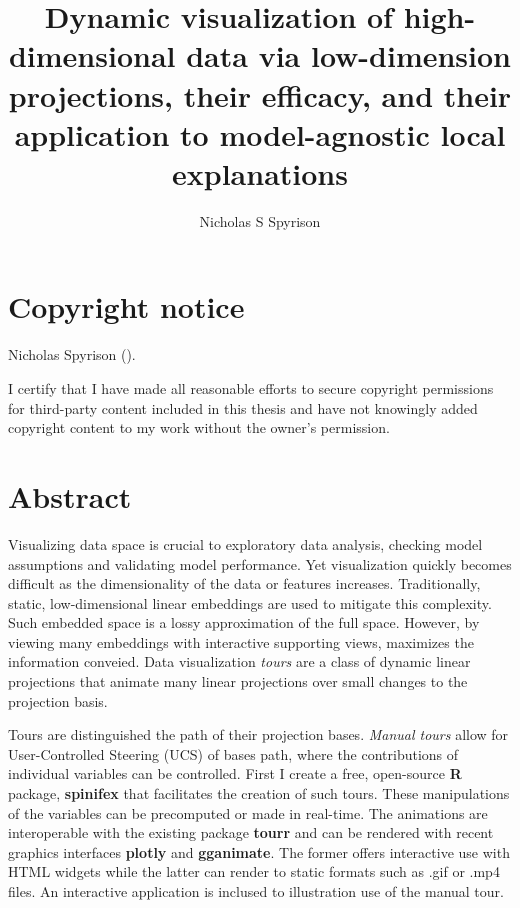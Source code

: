 \documentclass{template/monashthesis}
\author{Nicholas S Spyrison}
\title{Dynamic visualization of high-dimensional data via low-dimension projections, their efficacy, and their application to model-agnostic local explanations}
\begin{document}

\titlepage

{\sf\tighttoc\doublespacing}

\hypertarget{ch-copyright}{%
\chapter*{Copyright notice}\label{ch-copyright}}

\textcopyright { }Nicholas Spyrison (\number\the\year).

I certify that I have made all reasonable efforts to secure copyright permissions for third-party content included in this thesis and have not knowingly added copyright content to my work without the owner's permission.

\newpage

\hypertarget{abstract}{%
\chapter*{Abstract}\label{abstract}}

Visualizing data space is crucial to exploratory data analysis, checking model assumptions and validating model performance. Yet visualization quickly becomes difficult as the dimensionality of the data or features increases. Traditionally, static, low-dimensional linear embeddings are used to mitigate this complexity. Such embedded space is a lossy approximation of the full space. However, by viewing many embeddings with interactive supporting views, maximizes the information conveied. Data visualization \emph{tours} are a class of dynamic linear projections that animate many linear projections over small changes to the projection basis.

Tours are distinguished the path of their projection bases. \emph{Manual tours} allow for User-Controlled Steering (UCS) of bases path, where the contributions of individual variables can be controlled. First I create a free, open-source \textbf{R} package, \textbf{spinifex} that facilitates the creation of such tours. These manipulations of the variables can be precomputed or made in real-time. The animations are interoperable with the existing package \textbf{tourr} and can be rendered with recent graphics interfaces \textbf{plotly} and \textbf{gganimate}. The former offers interactive use with HTML widgets while the latter can render to static formats such as .gif or .mp4 files. An interactive application is inclused to illustration use of the manual tour.
\end{document}
